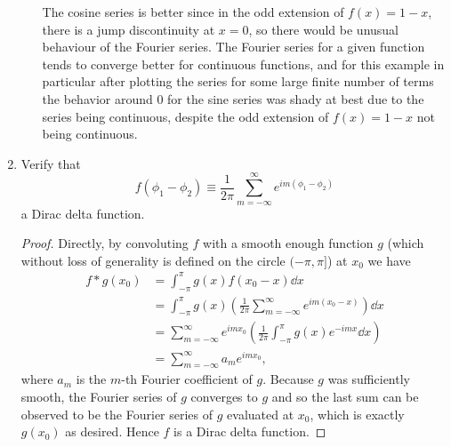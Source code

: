 \documentclass[11pt]{article}
\newcommand{\br}[1]{\left(#1\right)}
\begin{document}
\begin{enumerate}[label=28.\arabic*]
\begin{enumerate}[label=(\alph*)]
        The cosine series is better since in the odd extension of $f(x) = 1-x$, there is a jump discontinuity at $x=0$, so there would be unusual behaviour of the Fourier series. The Fourier series for a given function tends to converge better for continuous functions, and for this example in particular after plotting the series for some large finite number of terms the behavior around $0$ for the sine series was shady at best due to the series being continuous, despite the odd extension of $f(x) = 1-x$ not being continuous.
    \end{enumerate}
    \item Verify that \[f(\phi_1-\phi_2) \equiv \frac{1}{2\pi}\sum_{m=-\infty}^{\infty} e^{im(\phi_1-\phi_2)}\] a Dirac delta function.
    \begin{proof}
        Directly, by convoluting $f$ with a smooth enough function $g$ (which without loss of generality is defined on the circle $(-\pi,\pi]$) at $x_0$ we have \begin{align*}
            f\ast g(x_0) &= \int_{-\pi}^{\pi} g(x)f(x_0-x)\dd{x}\\
            &= \int_{-\pi}^{\pi} g(x)\br{\frac{1}{2\pi}\sum_{m=-\infty}^{\infty} e^{im(x_0-x)}}\dd{x}\\
            &= \sum_{m=-\infty}^{\infty} e^{imx_0} \br{\frac{1}{2\pi} \int_{-\pi}^{\pi} g(x)e^{-imx}\dd{x}}\\
            &=\sum_{m=-\infty}^{\infty} a_m e^{imx_0},
        \end{align*} where $a_m$ is the $m$-th Fourier coefficient of $g$. Because $g$ was sufficiently smooth, the Fourier series of $g$ converges to $g$ and so the last sum can be observed to be the Fourier series of $g$ evaluated at $x_0$, which is exactly $g(x_0)$ as desired. Hence $f$ is a Dirac delta function.
    \end{proof}
\end{enumerate}
\end{document}
